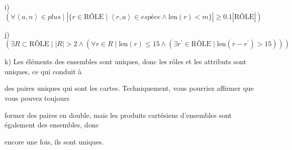 \documentclass{article}
\newcommand{\role}{\mbox{RÔLE}}
\newcommand{\tuple}[1]{\ensuremath{\left\langle #1 \right\rangle}}
\begin{document}
i) $ (  \forall \tuple{a,n} \in \textit{plus} \mid |\{ r \in \role \mid \tuple{r,a} \in \textit{espèce} \land \text{len}(r) < m \}| \geq 0.1 | \role | ) $

\vspace{0.5cm}

j) $( \exists R \subset \role \mid |R| > 2 \land ( \forall r \in R \mid \text{len}(r) \leq 15 \land ( \exists r^{\prime} \in \role \mid \text{len}(r - r^{\prime}) > 15 ) ) ) $

\vspace{0.5cm}

k) Les éléments des ensembles sont uniques, donc les rôles et les attributs sont uniques, ce qui conduit à

des paires uniques qui sont les cartes. Techniquement, vous pourriez affirmer que vous pouvez toujours 

former des paires en double, mais les produits cartésiens d'ensembles sont également des ensembles, donc 

encore une fois, ils sont uniques.
\end{document}

